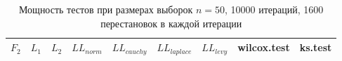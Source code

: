 \documentclass{article}
\begin{document}
\begin{longtable}{|c|c|c|c|c|c|c|c|c|}
  \caption{Мощность тестов при размерах выборок $n=50$, 10000 итераций, 1600 перестановок в каждой итерации}
  \label{table:n50} \\
  \hline
  $F_2$ & $L_{1}$ & $L_{2}$ & $LL_{norm}$ & $LL_{cauchy}$ & $LL_{laplace}$ & $LL_{levy}$ & wilcox.test & ks.test \\ \hline
  
\end{longtable}
\end{document}
